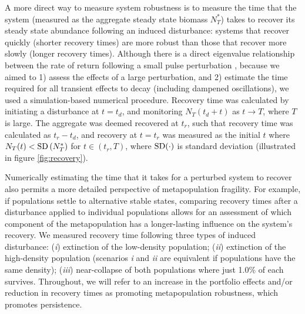 \documentclass{revtex4}
\begin{document}
A more direct way to measure system robustness is to measure the time that the system (measured as the aggregate steady state biomass $N_T^*$) takes to recover its steady state abundance following an induced disturbance: systems that recover quickly (shorter recovery times) are more robust than those that recover more slowly (longer recovery times).
Although there is a direct eigenvalue relationship between the rate of return following a small pulse perturbation \citep{GuckHolmes}, because we aimed to 1) assess the effects of a large perturbation, and 2) estimate the time required for all transient effects to decay (including dampened oscillations), we used a simulation-based numerical procedure.
Recovery time was calculated by initiating a disturbance at $t=t_d$, and monitoring $N_T(t_d+t)$ as $t\rightarrow T$, where $T$ is large. 
The aggregate was deemed recovered at $t_r$, such that recovery time was calculated as $t_r-t_d$, and recovery at $t=t_r$ was measured as the initial $t$ where $N_T(t) < {\rm SD}\left( N_T^* \right)$ for $t\in(t_r,T)$, where $\rm{SD}(\cdot)$ is standard deviation (illustrated in figure \ref{fig:recovery}).


Numerically estimating the time that it takes for a perturbed system to recover also permits a more detailed perspective of metapopulation fragility.
For example, if populations settle to alternative stable states, comparing recovery times after a disturbance applied to individual populations allows for an assessment of which component of the metapopulation has a longer-lasting influence on the system's recovery. %
We measured recovery time following three types of induced disturbance: (\emph{i}) extinction of the low-density population; (\emph{ii}) extinction of the high-density population (scenarios \emph{i} and \emph{ii} are equivalent if populations have the same density); (\emph{iii}) near-collapse of both populations where just 1.0\% of each survives.
Throughout, we will refer to an increase in the portfolio effects and/or reduction in recovery times as promoting metapopulation robustness, which promotes persistence.
\\
\end{document}

